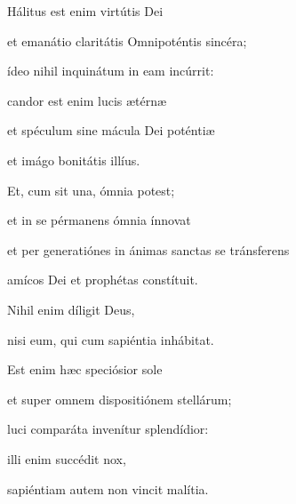 {\noindent Hálitus est enim virtútis Dei

\noindent et emanátio claritátis Omnipoténtis sincéra;

\noindent ídeo nihil inquinátum in eam incúrrit:

\noindent candor est enim lucis ætérnæ

\noindent et spéculum sine mácula Dei poténtiæ

\noindent et imágo bonitátis illíus.

\noindent Et, cum sit una, ómnia potest;

\noindent et in se pérmanens ómnia ínnovat

\noindent et per generatiónes in ánimas sanctas se tránsferens

\noindent amícos Dei et prophétas constítuit.

\noindent Nihil enim díligit Deus,

\noindent nisi eum, qui cum sapiéntia inhábitat.

\noindent Est enim hæc speciósior sole

\noindent et super omnem dispositiónem stellárum;

\noindent luci comparáta invenítur splendídior:

\noindent illi enim succédit nox,

\noindent sapiéntiam autem non vincit malítia.}
\newcommand{\responsoriumi}{\pars{Responsorium 1.} \scriptura{\Rbardot{} Sap. 7, 10-11 \Vbardot{} Prov. 7, 4; \textbf{H401}}

\vspace{-5mm}

\responsorium{III}{temporalia/resp-supersalutem-CROCHU.gtex}{}}
